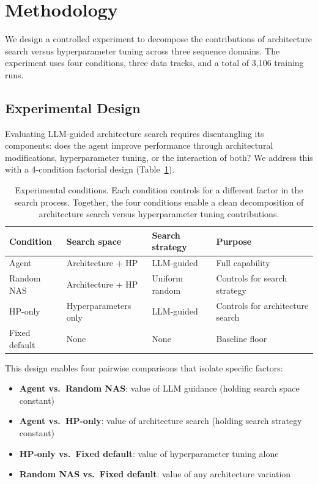 \section{Methodology}
\label{sec:methodology}

We design a controlled experiment to decompose the contributions of architecture search versus hyperparameter tuning across three sequence domains. The experiment uses four conditions, three data tracks, and a total of 3{,}106 training runs.

\subsection{Experimental Design}
\label{sec:experimental_design}

Evaluating LLM-guided architecture search requires disentangling its components: does the agent improve performance through architectural modifications, hyperparameter tuning, or the interaction of both? We address this with a 4-condition factorial design (Table~\ref{tab:conditions}).

\begin{table}[t]
\centering
\caption{Experimental conditions. Each condition controls for a different factor in the search process. Together, the four conditions enable a clean decomposition of architecture search versus hyperparameter tuning contributions.}
\label{tab:conditions}
\small
\begin{tabular}{@{}llll@{}}
\toprule
\textbf{Condition} & \textbf{Search space} & \textbf{Search strategy} & \textbf{Purpose} \\
\midrule
Agent & Architecture + HP & LLM-guided & Full capability \\
Random NAS & Architecture + HP & Uniform random & Controls for search strategy \\
HP-only & Hyperparameters only & LLM-guided & Controls for architecture search \\
Fixed default & None & None & Baseline floor \\
\bottomrule
\end{tabular}
\end{table}

This design enables four pairwise comparisons that isolate specific factors:
\begin{itemize}[nosep]
  \item \textbf{Agent vs.\ Random NAS}: value of LLM guidance (holding search space constant)
  \item \textbf{Agent vs.\ HP-only}: value of architecture search (holding search strategy constant)
  \item \textbf{HP-only vs.\ Fixed default}: value of hyperparameter tuning alone
  \item \textbf{Random NAS vs.\ Fixed default}: value of any architecture variation
\end{itemize}

